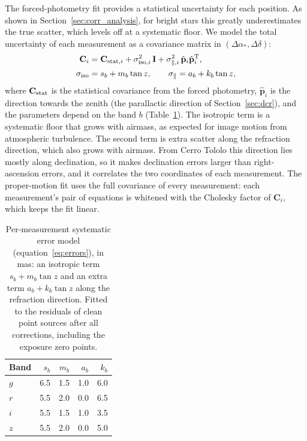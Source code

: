\documentclass[usenatbib]{mnras}   %
\begin{document}
The forced-photometry fit provides a statistical uncertainty for each position. As shown in Section~\ref{sec:corr_analysis}, for bright stars this greatly underestimates the true scatter, which levels off at a systematic floor. We model the total uncertainty of each measurement as a covariance matrix in $(\Delta\alpha_*, \Delta\delta)$:
\begin{equation}
\begin{aligned}
    \mathbf{C}_i &= \mathbf{C}_{{\rm stat},i} + \sigma_{{\rm iso},i}^2\,\mathbf{I} + \sigma_{\parallel,i}^2\,\hat{\mathbf{p}}_i\hat{\mathbf{p}}_i^{\rm T}, \\
    \sigma_{\rm iso} &= s_b + m_b \tan z, \qquad \sigma_\parallel = a_b + k_b \tan z,
\end{aligned}
    \label{eq:errors}
\end{equation}
where $\mathbf{C}_{\rm stat}$ is the statistical covariance from the forced photometry, $\hat{\mathbf{p}}_i$ is the direction towards the zenith (the parallactic direction of Section~\ref{sec:dcr}), and the parameters depend on the band $b$ (Table~\ref{tab:errmodel}). The isotropic term is a systematic floor that grows with airmass, as expected for image motion from atmospheric turbulence. The second term is extra scatter along the refraction direction, which also grows with airmass. From Cerro Tololo this direction lies mostly along declination, so it makes declination errors larger than right-ascension errors, and it correlates the two coordinates of each measurement. The proper-motion fit uses the full covariance of every measurement: each measurement's pair of equations is whitened with the Cholesky factor of $\mathbf{C}_i$, which keeps the fit linear.

\begin{table}
    \centering
    \caption{Per-measurement systematic error model (equation~\ref{eq:errors}), in mas: an isotropic term $s_b + m_b \tan z$ and an extra term $a_b + k_b \tan z$ along the refraction direction. Fitted to the residuals of clean point sources after all corrections, including the exposure zero points.}
    \label{tab:errmodel}
    \begin{tabular}{lrrrr}
        \hline
        Band & $s_b$ & $m_b$ & $a_b$ & $k_b$ \\
        \hline
        $g$ & 6.5 & 1.5 & 1.0 & 6.0 \\
        $r$ & 5.5 & 2.0 & 0.0 & 6.5 \\
        $i$ & 5.5 & 1.5 & 1.0 & 3.5 \\
        $z$ & 5.5 & 2.0 & 0.0 & 5.0 \\
        \hline
    \end{tabular}
\end{table}
\end{document}
